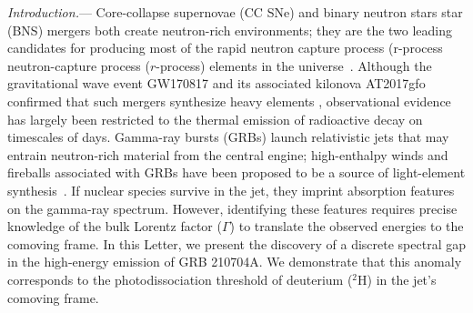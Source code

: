 \documentclass[prd,twocolumn,amsmath,amssymb,aps,linenumbers]{revtex4-2} %
\providecommand{\DIFaddtex}[1]{{\protect\color{blue} \sf #1}} %
\providecommand{\DIFdeltex}[1]{{\protect\color{red} \scriptsize #1}} %
\providecommand{\DIFaddbegin}{} %
\providecommand{\DIFaddend}{} %
\providecommand{\DIFdelbegin}{} %
\providecommand{\DIFdelend}{} %
\providecommand{\DIFadd}[1]{\texorpdfstring{\DIFaddtex{#1}}{#1}} %
\providecommand{\DIFdel}[1]{\texorpdfstring{\DIFdeltex{#1}}{}} %
\newcommand{\DIFscaledelfig}{0.5}
\newlength{\DIFdelgraphicswidth} %
\newlength{\DIFdelgraphicsheight} %
\newcommand{\DIFaddincludegraphics}[2][]{{\color{blue}\fbox{\DIFOincludegraphics[#1]{#2}}}} %
\newcommand{\DIFdelincludegraphics}[2][]{%
\sbox{\DIFdelgraphicsbox}{\DIFOincludegraphics[#1]{#2}}%
\settoboxwidth{\DIFdelgraphicswidth}{\DIFdelgraphicsbox} %
\settoboxtotalheight{\DIFdelgraphicsheight}{\DIFdelgraphicsbox} %
\scalebox{\DIFscaledelfig}{%
\parbox[b]{\DIFdelgraphicswidth}{\usebox{\DIFdelgraphicsbox}\\[-\baselineskip] \rule{\DIFdelgraphicswidth}{0em}}\llap{\resizebox{\DIFdelgraphicswidth}{\DIFdelgraphicsheight}{%
\setlength{\unitlength}{\DIFdelgraphicswidth}%
\begin{picture}(1,1)%
\thicklines\linethickness{2pt} %
{\color[rgb]{1,0,0}\put(0,0){\framebox(1,1){}}}%
{\color[rgb]{1,0,0}\put(0,0){\line( 1,1){1}}}%
{\color[rgb]{1,0,0}\put(0,1){\line(1,-1){1}}}%
\end{picture}%
}\hspace*{3pt}}} %
} %
\DeclareRobustCommand{\DIFaddbegin}{\DIFOaddbegin \let\includegraphics\DIFaddincludegraphics} %
\DeclareRobustCommand{\DIFaddend}{\DIFOaddend \let\includegraphics\DIFOincludegraphics} %
\DeclareRobustCommand{\DIFdelbegin}{\DIFOdelbegin \let\includegraphics\DIFdelincludegraphics} %
\DeclareRobustCommand{\DIFdelend}{\DIFOaddend \let\includegraphics\DIFOincludegraphics} %
\begin{document}
\maketitle

\textit{Introduction.}---%
Core-collapse supernovae (CC SNe) and binary neutron \DIFdelbegin \DIFdel{stars }\DIFdelend \DIFaddbegin \DIFadd{star }\DIFaddend (BNS) mergers both create neutron-rich environments; they are the two leading candidates for producing most of the rapid \DIFdelbegin \DIFdel{neutron capture process (r-process}\DIFdelend \DIFaddbegin \DIFadd{neutron-capture process ($r$-process}\DIFaddend ) elements in the universe~\citep[e.g.][]{1974ApJ...192L.145L, 1989Natur.340..126E,2007PhR...450...97A,2004A&A...416..997A,2014MNRAS.438.2177M,2015MNRAS.452.1970W, 2018ApJ...869..130R,2019LRR....23....1M,2020ApJ...903L...3W,2024Natur.626..737L}. Although the gravitational wave event GW170817 and its associated kilonova AT2017gfo confirmed that such mergers synthesize heavy elements \citep{2017PhRvL.119p1101A, 2019LRR....23....1M}, observational evidence has largely been restricted to the thermal emission of radioactive decay on timescales of days. 
Gamma-ray bursts (GRBs) launch relativistic jets that may entrain neutron-rich material from the central engine; high-enthalpy winds and fireballs associated with GRBs have been proposed to be a source of light-element synthesis~\citep[][]{1967ARA&A...5..525F,2001ApJ...561..957P,2000ApJ...533..424O,2001ApJ...562..887T,2002ApJ...580..368P,2003ApJ...588..931B}. If nuclear species survive in the jet, they imprint absorption features on the gamma-ray spectrum. However, identifying these features requires precise knowledge of the bulk Lorentz factor ($\Gamma$) to translate the observed energies to the comoving frame. In this Letter, we present the discovery of a discrete spectral gap in the high-energy emission of GRB 210704A. We demonstrate that this anomaly corresponds to the photodissociation threshold of deuterium ($^2$H) in the jet's comoving frame. %
\end{document}
